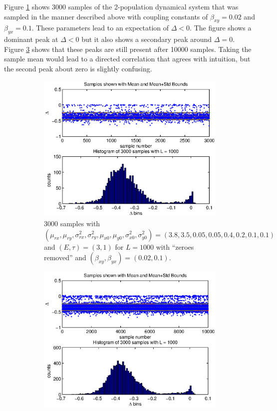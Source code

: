 \documentclass[a4paper,11pt]{article}
\begin{document}
Figure \ref{fig:TwoPopDynSampFig1} shows 3000 samples of the 2-population dynamical system that was sampled in the manner described above with coupling constants of $\beta_{xy}=0.02$ and $\beta_{yx}=0.1$.  These parameters lead to an expectation of $\Delta < 0$.  The figure shows a dominant peak at $\Delta < 0$ but it also shows a secondary peak around $\Delta=0$.  Figure \ref{fig:TwoPopDynSampFig1_10000} shows that these peaks are still present after 10000 samples.  Taking the sample mean would lead to a directed correlation that agrees with intuition, but the second peak about zero is slightly confusing.
\begin{figure}[h!t]
\centering
\begin{subfigure}[b]{0.4\textwidth}
\label{fig:TwoPopDynSampFig1}
\includegraphics[scale=0.55]{TwoPopDynSampFig1.eps}
\caption{3000 samples with $\left(\mu_{rx},\mu_{ry},\sigma^2_{rx},\sigma^2_{ry},\mu_{x0},\mu_{y0},\sigma^2_{x0},\sigma^2_{y0}\right) = \left(3.8,3.5,0.05,0.05,0.4,0.2,0.1,0.1\right)$ and $\left(E,\tau\right)=\left(3,1\right)$ for $L=1000$ with ``zeroes removed'' and $(\beta_{xy},\beta_{yx})=(0.02,0.1)$.}
\end{subfigure}
\begin{subfigure}[b]{0.4\textwidth}
\label{fig:TwoPopDynSampFig1_10000}
\includegraphics[scale=0.55]{TwoPopDynSampFig1_10000.eps}

\end{subfigure}
\end{figure}
\end{document}
